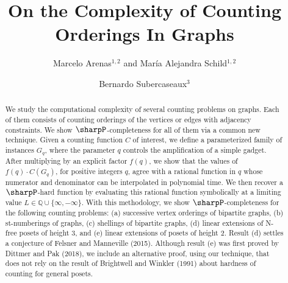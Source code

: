 \documentclass[11pt]{amsart}
\title{On the Complexity of Counting Orderings In Graphs}
\author{Marcelo Arenas$^{1,2}$ and Mar\'ia Alejandra Schild$^{1,2}$}
\author{Bernardo Subercaseaux$^3$}
\begin{document}
\begin{abstract}
    We study the computational complexity of several counting problems on graphs. Each of them consists of counting orderings of the vertices or edges with adjacency constraints.
    We show $\sharpP$-completeness for all of them via a common new technique. Given a counting function $C$ of interest, we define a parameterized family of instances $G_q$,
    where the parameter $q$ controls the amplification of a simple gadget.
    After multiplying by an explicit factor $f(q)$, we show that the values of $f(q) \cdot C(G_q)$, for positive integers $q$, agree with a rational function in $q$ whose numerator and denominator can be interpolated in polynomial time. We then recover a $\sharpP$-hard function by evaluating this rational function symbolically at a limiting value $L \in \mathbb{Q} \cup \{ \infty, -\infty\}$. With this methodology, we show $\sharpP$-completeness for the following counting problems: (a) successive vertex orderings of bipartite graphs, (b) st-numberings of graphs, (c) shellings of bipartite graphs, (d) linear extensions of N-free posets of height $3$, and (e) linear extensions of posets of height $2$.
    Result (d) settles a conjecture of Felsner and Manneville (2015).
    Although result (e) was first proved by Dittmer and Pak (2018), we include an alternative proof, using our technique, that does not rely on the result of Brightwell and Winkler (1991) about hardness of counting for general posets.





\end{abstract}
\end{document}
